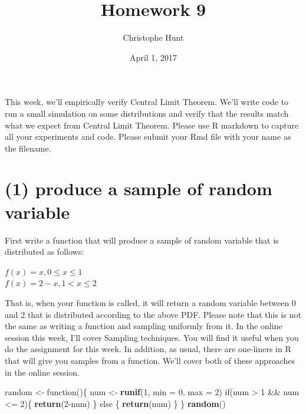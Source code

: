 \documentclass[]{article}
\title{Homework 9}
\author{Christophe Hunt}
\date{April 1, 2017}
\newenvironment{Shaded}{\begin{snugshade}}{\end{snugshade}}
\newcommand{\KeywordTok}[1]{\textcolor[rgb]{0.13,0.29,0.53}{\textbf{{#1}}}}
\newcommand{\DataTypeTok}[1]{\textcolor[rgb]{0.13,0.29,0.53}{{#1}}}
\newcommand{\DecValTok}[1]{\textcolor[rgb]{0.00,0.00,0.81}{{#1}}}
\newcommand{\StringTok}[1]{\textcolor[rgb]{0.31,0.60,0.02}{{#1}}}
\newcommand{\NormalTok}[1]{{#1}}
\begin{document}
\maketitle

{
\setcounter{tocdepth}{2}
\tableofcontents
}
This week, we'll empirically verify Central Limit Theorem. We'll write
code to run a small simulation on some distributions and verify that the
results match what we expect from Central Limit Theorem. Please use R
markdown to capture all your experiments and code. Please submit your
Rmd file with your name as the filename.

\newpage

\section{(1) produce a sample of random
variable}\label{produce-a-sample-of-random-variable}

First write a function that will produce a sample of random variable
that is distributed as follows:

\(f(x) = x, 0 \leq x \leq 1\)\\
\(f(x) = 2 - x, 1 < x \leq 2\)

That is, when your function is called, it will return a random variable
between 0 and 2 that is distributed according to the above PDF. Please
note that this is not the same as writing a function and sampling
uniformly from it. In the online session this week, I'll cover Sampling
techniques. You will find it useful when you do the assignment for this
week. In addition, as usual, there are one-liners in R that will give
you samples from a function. We'll cover both of these approaches in the
online session.

\begin{Shaded}
\begin{Highlighting}[]
\NormalTok{random <-}\StringTok{ }\NormalTok{function()\{}
          \NormalTok{num <-}\StringTok{ }\KeywordTok{runif}\NormalTok{(}\DecValTok{1}\NormalTok{, }\DataTypeTok{min =} \DecValTok{0}\NormalTok{, }\DataTypeTok{max =} \DecValTok{2}\NormalTok{) }
          \NormalTok{if(num >}\StringTok{ }\DecValTok{1} \NormalTok{&&}\StringTok{ }\NormalTok{num <=}\StringTok{ }\DecValTok{2}\NormalTok{)\{}
             \KeywordTok{return}\NormalTok{(}\DecValTok{2}\NormalTok{-num)}
            \NormalTok{\} else \{}
              \KeywordTok{return}\NormalTok{(num)}
            \NormalTok{\}}
          \NormalTok{\} }
\KeywordTok{random}\NormalTok{()}
\end{Highlighting}
\end{Shaded}
\end{document}
